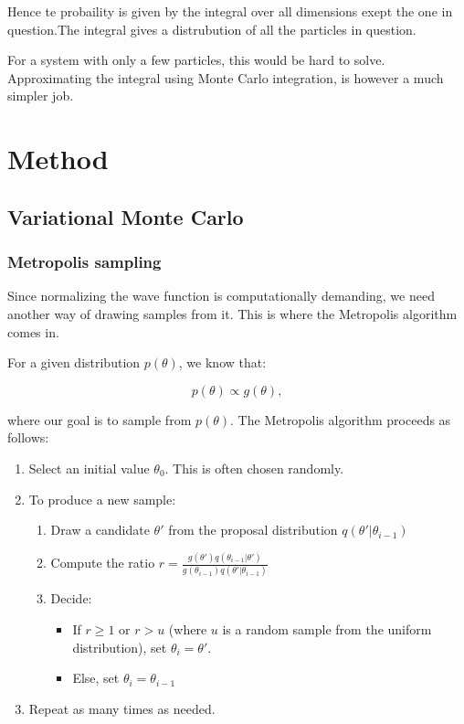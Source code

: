 \documentclass[
]{article}
\providecommand{\tightlist}{%
  \setlength{\itemsep}{0pt}\setlength{\parskip}{0pt}}
\begin{document}
Hence te probaility is given by the integral over all dimensions exept
the one in question.The integral gives a distrubution of all the
particles in question.

For a system with only a few particles, this would be hard to solve.
Approximating the integral using Monte Carlo integration, is however a
much simpler job.

\hypertarget{method}{%
\section{Method}\label{method}}

\hypertarget{variational-monte-carlo}{%
\subsection{Variational Monte Carlo}\label{variational-monte-carlo}}

\hypertarget{metropolis-sampling}{%
\subsubsection*{Metropolis sampling}\label{metropolis-sampling}}

Since normalizing the wave function is computationally demanding, we
need another way of drawing samples from it. This is where the
Metropolis algorithm comes in.

For a given distribution \(p(\theta)\), we know that:

\[p(\theta) \propto g(\theta),\]

where our goal is to sample from \(p(\theta)\). The Metropolis algorithm
proceeds as follows:

\begin{enumerate}
\def\labelenumi{\arabic{enumi}.}
\tightlist
\item
  Select an initial value \(\theta_0\). This is often chosen randomly.
\item
  To produce a new sample:

  \begin{enumerate}
  \def\labelenumii{\arabic{enumii}.}
  \tightlist
  \item
    Draw a candidate \(\theta'\) from the proposal distribution
    \(q(\theta'|\theta_{i-1})\)
  \item
    Compute the ratio
    \(r = \frac{g(\theta')q(\theta_{i-1}|\theta')}{g(\theta_{i-1})q(\theta'|\theta_{i-1})}\)
  \item
    Decide:

    \begin{itemize}
    \tightlist
    \item
      If \(r \ge 1\) or \(r > u\) (where \(u\) is a random sample from
      the uniform distribution), set \(\theta_{i} = \theta'\).
    \item
      Else, set \(\theta_{i} = \theta_{i-1}\)
    \end{itemize}
  \end{enumerate}
\item
  Repeat as many times as needed.
\end{enumerate}
\end{document}
